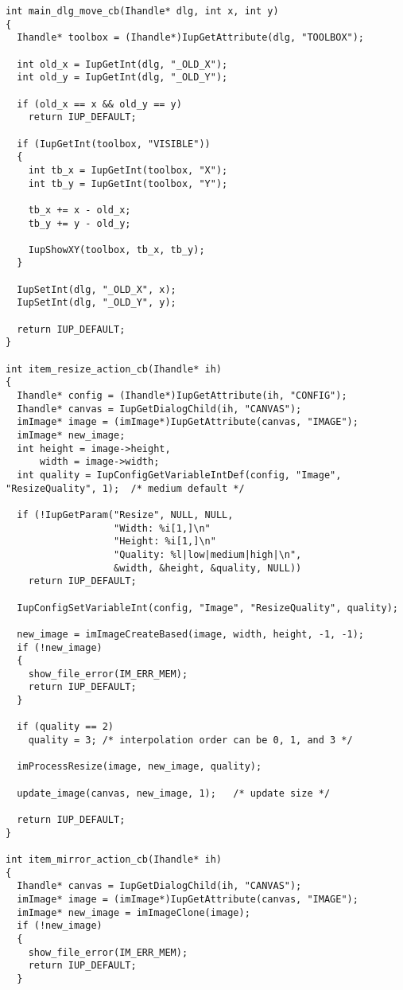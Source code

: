 \documentclass{ctexart}
\begin{document}
\begin{lstlisting}
int main_dlg_move_cb(Ihandle* dlg, int x, int y)
{
  Ihandle* toolbox = (Ihandle*)IupGetAttribute(dlg, "TOOLBOX");

  int old_x = IupGetInt(dlg, "_OLD_X");
  int old_y = IupGetInt(dlg, "_OLD_Y");

  if (old_x == x && old_y == y)
    return IUP_DEFAULT;
  
  if (IupGetInt(toolbox, "VISIBLE"))
  {
    int tb_x = IupGetInt(toolbox, "X");
    int tb_y = IupGetInt(toolbox, "Y");

    tb_x += x - old_x;
    tb_y += y - old_y;

    IupShowXY(toolbox, tb_x, tb_y);
  }

  IupSetInt(dlg, "_OLD_X", x);
  IupSetInt(dlg, "_OLD_Y", y);

  return IUP_DEFAULT;
}

int item_resize_action_cb(Ihandle* ih)
{
  Ihandle* config = (Ihandle*)IupGetAttribute(ih, "CONFIG");
  Ihandle* canvas = IupGetDialogChild(ih, "CANVAS");
  imImage* image = (imImage*)IupGetAttribute(canvas, "IMAGE");
  imImage* new_image;
  int height = image->height, 
      width = image->width;
  int quality = IupConfigGetVariableIntDef(config, "Image", "ResizeQuality", 1);  /* medium default */

  if (!IupGetParam("Resize", NULL, NULL, 
                   "Width: %i[1,]\n"
                   "Height: %i[1,]\n"
                   "Quality: %l|low|medium|high|\n",
                   &width, &height, &quality, NULL))
    return IUP_DEFAULT;

  IupConfigSetVariableInt(config, "Image", "ResizeQuality", quality);

  new_image = imImageCreateBased(image, width, height, -1, -1);
  if (!new_image)
  {
    show_file_error(IM_ERR_MEM);
    return IUP_DEFAULT;
  }

  if (quality == 2)
    quality = 3; /* interpolation order can be 0, 1, and 3 */

  imProcessResize(image, new_image, quality);

  update_image(canvas, new_image, 1);   /* update size */

  return IUP_DEFAULT;
}

int item_mirror_action_cb(Ihandle* ih)
{
  Ihandle* canvas = IupGetDialogChild(ih, "CANVAS");
  imImage* image = (imImage*)IupGetAttribute(canvas, "IMAGE");
  imImage* new_image = imImageClone(image);
  if (!new_image)
  {
    show_file_error(IM_ERR_MEM);
    return IUP_DEFAULT;
  }


\end{lstlisting}
\end{document}
